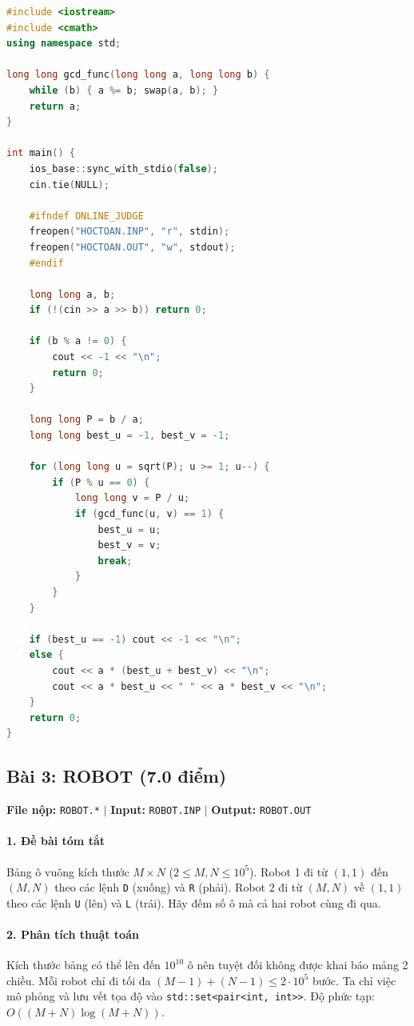 \documentclass[11pt,a4paper]{article}
\begin{document}
\begin{lstlisting}[language=C++]
#include <iostream>
#include <cmath>
using namespace std;

long long gcd_func(long long a, long long b) {
    while (b) { a %= b; swap(a, b); }
    return a;
}

int main() {
    ios_base::sync_with_stdio(false);
    cin.tie(NULL);

    #ifndef ONLINE_JUDGE
    freopen("HOCTOAN.INP", "r", stdin);
    freopen("HOCTOAN.OUT", "w", stdout);
    #endif

    long long a, b;
    if (!(cin >> a >> b)) return 0;

    if (b % a != 0) {
        cout << -1 << "\n";
        return 0;
    }

    long long P = b / a;
    long long best_u = -1, best_v = -1;

    for (long long u = sqrt(P); u >= 1; u--) {
        if (P % u == 0) {
            long long v = P / u;
            if (gcd_func(u, v) == 1) {
                best_u = u;
                best_v = v;
                break;
            }
        }
    }

    if (best_u == -1) cout << -1 << "\n";
    else {
        cout << a * (best_u + best_v) << "\n";
        cout << a * best_u << " " << a * best_v << "\n";
    }
    return 0;
}
\end{lstlisting}

\newpage

\subsection{Bài 3: ROBOT (7.0 điểm)}
\textbf{File nộp:} \texttt{ROBOT.*} $\vert$ \textbf{Input:} \texttt{ROBOT.INP} $\vert$ \textbf{Output:} \texttt{ROBOT.OUT}

\paragraph{1. Đề bài tóm tắt}
Bảng ô vuông kích thước $M \times N$ ($2 \le M, N \le 10^5$). Robot 1 đi từ $(1, 1)$ đến $(M, N)$ theo các lệnh \texttt{D} (xuống) và \texttt{R} (phải). Robot 2 đi từ $(M, N)$ về $(1, 1)$ theo các lệnh \texttt{U} (lên) và \texttt{L} (trái). Hãy đếm số ô mà cả hai robot cùng đi qua.

\paragraph{2. Phân tích thuật toán}
Kích thước bảng có thể lên đến $10^{10}$ ô nên tuyệt đối không được khai báo mảng 2 chiều. Mỗi robot chỉ đi tối đa $(M - 1) + (N - 1) \le 2 \cdot 10^5$ bước. Ta chỉ việc mô phỏng và lưu vết tọa độ vào \texttt{std::set<pair<int, int>>}. Độ phức tạp: $O((M + N) \log(M + N))$.
\end{document}
